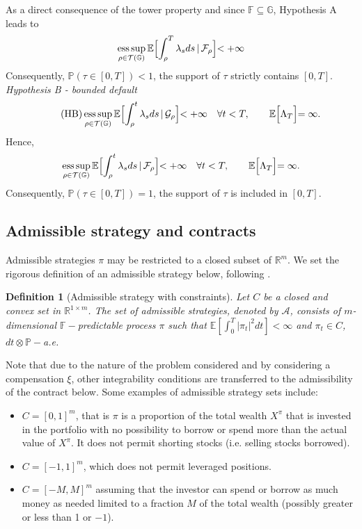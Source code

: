 \documentclass[11pt,a4paper]{article}
\theoremstyle{thmstyleone}%
\theoremstyle{thmstyletwo}%
\theoremstyle{thmstylethree}%
\newtheorem{definition}{Definition}%
\newcommand{\E}{\mathbb{E}}
\newcommand{\F}{\mathbb{F}}
\newcommand{\G}{\mathbb{G}}
\DeclareMathOperator*{\esssup}{ess\,sup}
\begin{document}
As a direct consequence of the tower property and since $\F \subseteq \G$, Hypothesis A leads to
\[
    \esssup_{\rho \in \mathcal{T}(\G)} \E\Bigl[\int_{\rho}^T \lambda_s ds \, | \, \mathcal F_{\rho}\Bigl] < + \infty
\]
Consequently, $\mathbb P(\tau\in [0,T])<1$, the support of $\tau$ strictly contains $[0,T]$.\\



\noindent \textit{Hypothesis B - bounded default}
\begin{equation} \label{H:bounded}
    \tag{HB}
    \esssup_{\rho \in \mathcal{T}(\G)} \E\Bigl[\int_{\rho}^t \lambda_s ds \, | \,  \mathcal G_{\rho}\Bigl] < + \infty \quad \forall t < T, \qquad \E\Bigl[ \Lambda_T \Bigl] = \infty.
\end{equation}
Hence, \[
    \esssup_{\rho \in \mathcal{T}(\G)} \E\Bigl[\int_{\rho}^t \lambda_s ds \, | \,  \mathcal F_{\rho}\Bigl] < + \infty \quad \forall t < T, \qquad \E\Bigl[ \Lambda_T \Bigl] = \infty.
\]
Consequently, $\mathbb P(\tau\in [0,T])=1$, the support of $\tau$ is included in $[0,T]$.





\subsection{Admissible strategy and contracts}
 Admissible strategies $\pi$ may be restricted to a closed subset of $\mathbb{R}^m$. We set the rigorous definition of an admissible strategy below, following \cite[Definition 1]{hu2005utility}.
 \begin{definition}[Admissible strategy with constraints]\label{admissible}
     Let $C$ be a closed and convex set in $\mathbb R^{1\times m}$. The set of admissible strategies, denoted by $\mathcal A$, consists of $m$-dimensional $\mathbb F-$predictable process $\pi$ such that $\mathbb E[\int_0^T|\pi_t|^2dt]<\infty$ and $\pi_t\in C$, $dt\otimes \mathbb P-$a.e.
 \end{definition}
 Note that due to the nature of the problem considered and by considering a compensation $\xi$, other integrability conditions are transferred to the admissibility of the contract below. 
Some examples of admissible strategy sets include:
\begin{itemize}
    \item $C = [0,1]^m$, that is $\pi$ is a proportion of the total wealth $X^\pi$ that is invested in the portfolio with no possibility to borrow or spend more than the actual value of $X^\pi$. It does not permit shorting stocks (i.e. selling stocks borrowed).
    \item $C =[-1,1]^m$, which does not permit leveraged positions.
    \item $C=[-M,M]^m$ assuming that the investor can spend or borrow as much money as needed limited to a fraction $M$ of the total wealth (possibly greater or less than 1 or $-1$).
\end{itemize}
\end{document}
